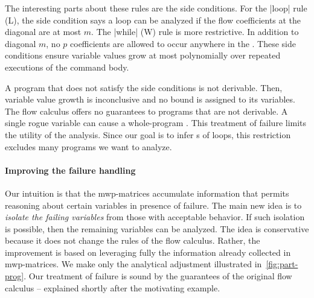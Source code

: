 The interesting parts about these rules are the side conditions. For the
\pr|loop| rule (L), the side condition says a loop can be analyzed if the
flow coefficients at the  diagonal are at most
\(m\). The \pr|while| (W) rule is more restrictive. In addition to
diagonal \(m\), no \(p\) coefficients are allowed to occur
anywhere in the . These side conditions ensure variable values
grow at most polynomially over repeated executions of the command body.

A program that does not satisfy the side conditions is not
derivable. Then, variable value growth is inconclusive and
no bound is assigned to its variables. The flow calculus
offers no guarantees to programs that are not derivable. A single rogue variable
can cause a whole-program . This treatment of failure
limits the utility of the analysis. Since our goal is to infer
s of loops, this restriction excludes many programs we want
to analyze.

\paragraph*{Improving the failure handling}
Our intuition is that the mwp-matrices accumulate information
that permits reasoning about {certain variables} in presence of
failure. The main new idea is to \emph{isolate the
failing variables} from those with acceptable behavior. If such isolation is
possible, then the remaining variables can be analyzed. The idea is conservative
because it does not change the rules of the flow calculus.
Rather, the improvement is based on leveraging fully the information already
collected in mwp-matrices. We make only the analytical
adjustment illustrated in~\autoref{fig:part-prog}. Our treatment of failure is
sound by the guarantees of the original flow calculus --
explained shortly after the motivating example.

